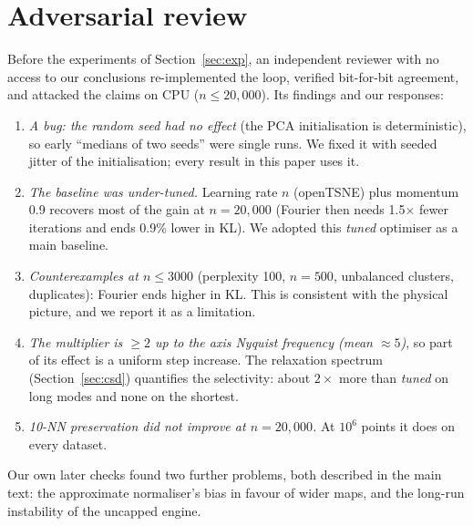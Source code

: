 \documentclass[11pt]{article}
\begin{document}
\section{Adversarial review}\label{app:adversary}
Before the experiments of Section~\ref{sec:exp}, an independent reviewer with no access to our conclusions
re-implemented the loop, verified bit-for-bit agreement, and attacked the claims on CPU ($n\le20{,}000$).
Its findings and our responses:
\begin{enumerate}
\item \emph{A bug: the random seed had no effect} (the PCA initialisation is deterministic), so early
``medians of two seeds'' were single runs. We fixed it with seeded jitter of the initialisation; every result
in this paper uses it.
\item \emph{The baseline was under-tuned.} Learning rate $n$ (openTSNE) plus momentum 0.9 recovers most of the
gain at $n=20{,}000$ (Fourier then needs 1.5$\times$ fewer iterations and ends 0.9\% lower in KL). We adopted
this \emph{tuned} optimiser as a main baseline.
\item \emph{Counterexamples at $n\le3000$} (perplexity 100, $n=500$, unbalanced clusters, duplicates): Fourier
ends higher in KL. This is consistent with the physical picture, and we report it as a limitation.
\item \emph{The multiplier is $\ge2$ up to the axis Nyquist frequency (mean $\approx5$)}, so part of its effect
is a uniform step increase. The relaxation spectrum (Section~\ref{sec:csd}) quantifies the selectivity: about
$2\times$ more than \emph{tuned} on long modes and none on the shortest.
\item \emph{10-NN preservation did not improve at $n=20{,}000$.} At $10^6$ points it does on every dataset.
\end{enumerate}
Our own later checks found two further problems, both described in the main text: the approximate
normaliser's bias in favour of wider maps, and the long-run instability of the uncapped engine.
\end{document}
